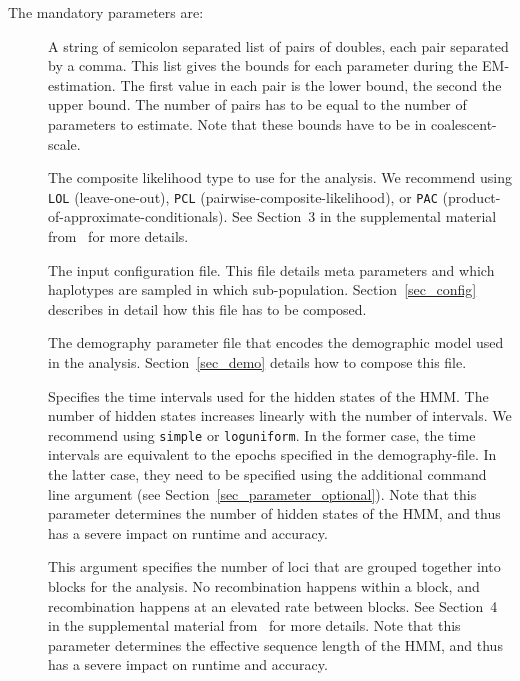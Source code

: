 \documentclass{article}
\numberwithin{equation}{section}
\begin{document}
The mandatory parameters are:
\begin{description}
	\item[] A string of semicolon separated list of pairs of doubles, each pair separated by a comma. This list gives the bounds for each parameter during the EM-estimation. The first value in each pair is the lower bound, the second the upper bound. The number of pairs has to be equal to the number of parameters to estimate. Note that these bounds have to be in coalescent-scale.
	\item[] The composite likelihood type to use for the analysis. We recommend using \texttt{LOL} (leave-one-out), \texttt{PCL} (pairwise-composite-likelihood), or \texttt{PAC} (product-of-approximate-conditionals). See Section~3 in the supplemental material from~\cite{Steinruecken2019} for more details.
	\item[] The input configuration file. This file details meta parameters and which haplotypes are sampled in which sub-population. Section~\ref{sec_config} describes in detail how this file has to be composed.
	\item[] The demography parameter file that encodes the demographic model used in the analysis. Section~\ref{sec_demo} details how to compose this file.
	\item[] Specifies the time intervals used for the hidden states of the HMM. The number of hidden states increases linearly with the number of intervals. We recommend using \texttt{simple} or \texttt{loguniform}. In the former case, the time intervals are equivalent to the epochs specified in the demography-file. In the latter case, they need to be specified using the additional command line argument  (see Section~\ref{sec_parameter_optional}). Note that this parameter determines the number of hidden states of the HMM, and thus has a severe impact on runtime and accuracy.
	\item[] This argument specifies the number of loci that are grouped together into blocks for the analysis. No recombination happens within a block, and recombination happens at an elevated rate between blocks. See Section~4 in the supplemental material from~\cite{Steinruecken2019} for more details. Note that this parameter determines the effective sequence length of the HMM, and thus has a severe impact on runtime and accuracy.

\end{description}
\end{document}
